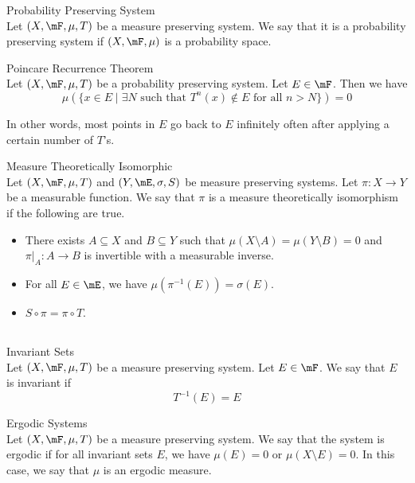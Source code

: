 \documentclass[a4paper]{article}
\begin{document}
\begin{defn}{Probability Preserving System}{}\\
Let $(X,\mF,\mu,T)$ be a measure preserving system. We say that it is a probability preserving system if $(X,\mF,\mu)$ is a probability space. 
\end{defn}

\begin{thm}{Poincare Recurrence Theorem}{}\\
Let $(X,\mF,\mu,T)$ be a probability preserving system. Let $E\in\mF$. Then we have $$\mu(\{x\in E\;|\;\exists N\text{ such that }T^n(x)\notin E\text{ for all }n>N\})=0$$
\end{thm}

In other words, most points in $E$ go back to $E$ infinitely often after applying a certain number of $T$'s. 

\begin{defn}{Measure Theoretically Isomorphic}{}\\
Let $(X,\mF,\mu,T)$ and $(Y,\mE,\sigma,S)$ be measure preserving systems. Let $\pi:X\to Y$ be a measurable function. We say that $\pi$ is a measure theoretically isomorphism if the following are true. 
\begin{itemize}
\item There exists $A\subseteq X$ and $B\subseteq Y$ such that $\mu(X\setminus A)=\mu(Y\setminus B)=0$ and $\pi|_A:A\to B$ is invertible with a measurable inverse. 
\item For all $E\in\mE$, we have $\mu(\pi^{-1}(E))=\sigma(E)$. 
\item $S\circ\pi=\pi\circ T$. 
\end{itemize}
\end{defn}

\subsection{}
\begin{defn}{Invariant Sets}{}\\
Let $(X,\mF,\mu,T)$ be a measure preserving system. Let $E\in\mF$. We say that $E$ is invariant if $$T^{-1}(E)=E$$
\end{defn}

\begin{defn}{Ergodic Systems}{}\\
Let $(X,\mF,\mu,T)$ be a measure preserving system. We say that the system is ergodic if for all invariant sets $E$, we have $\mu(E)=0$ or $\mu(X\setminus E)=0$. In this case, we say that $\mu$ is an ergodic measure. 
\end{defn}
\end{document}
